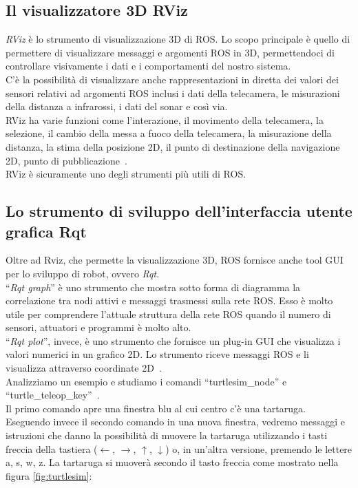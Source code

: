 \subsection{Il visualizzatore 3D RViz}
\textit{RViz} è lo strumento di visualizzazione 3D di ROS. Lo scopo principale è quello di permettere di visualizzare messaggi e argomenti ROS in 3D, permettendoci di controllare visivamente i dati e i comportamenti del nostro sistema.\\
C'è la possibilità di visualizzare anche rappresentazioni in diretta dei valori dei sensori relativi ad argomenti ROS inclusi i dati della telecamera, le misurazioni della distanza a infrarossi, i dati del sonar e così via.\\
RViz ha varie funzioni come l'interazione, il movimento della telecamera, la selezione, il cambio della messa a fuoco della telecamera, la misurazione della distanza, la stima della posizione 2D, il punto di destinazione della navigazione 2D,
punto di pubblicazione~\cite{25}.\\
RViz è sicuramente uno degli strumenti più utili di ROS.

\subsection{Lo strumento di sviluppo dell'interfaccia utente grafica Rqt}
Oltre ad Rviz, che permette la visualizzazione 3D, ROS fornisce anche tool GUI per lo sviluppo di robot, ovvero \textit{Rqt}. \\
``\textit{Rqt graph}'' è uno strumento che mostra sotto forma di diagramma la correlazione tra nodi attivi e messaggi trasmessi sulla rete ROS. Esso è molto utile per comprendere l'attuale struttura della rete ROS quando il numero di sensori, attuatori e programmi è  molto alto.\\
``\textit{Rqt plot}'', invece, è uno strumento che fornisce un plug-in GUI che visualizza i valori numerici in un grafico 2D. Lo strumento riceve messaggi ROS e li visualizza attraverso coordinate 2D~\cite{22}.\\ 
Analizziamo un esempio e studiamo i comandi ``turtlesim\_node'' e ``turtle\_teleop\_key''~\cite{24}.\\
Il primo comando apre una finestra blu al cui centro c'è una tartaruga. Eseguendo invece il secondo comando in una nuova finestra, vedremo messaggi e istruzioni che danno la possibilità di muovere la tartaruga utilizzando i tasti freccia della tastiera ($ \gets $, $ \to $, $ \uparrow $, $ \downarrow $) o, in un'altra versione, premendo le lettere a, s, w, z. La tartaruga si muoverà secondo il tasto freccia come mostrato nella figura \ref{fig:turtlesim}:

